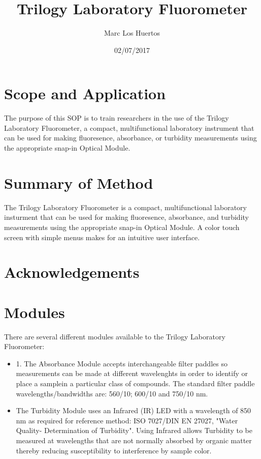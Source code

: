 \documentclass[12pt]{../SOP3_beta}\usepackage[]{graphicx}\usepackage[]{color}
\title{Trilogy Laboratory Fluorometer}
\date{02/07/2017}
\author{Marc Los Huertos}
\begin{document}
\maketitle

\section{Scope and Application}

\NP The purpose of this SOP is to train researchers in the use of the Trilogy Laboratory Fluorometer, a compact, multifunctional laboratory instrument that can be used for making fluoresence, absorbance, or turbidity measurements using the appropriate snap-in Optical Module. 

\section{Summary of Method}

\NP The Trilogy Laboratory Fluorometer is a compact, multifunctional laboratory insturment that can be used for making fluoresence, absorbance, and turbidity measurements using the appropriate snap-in Optical Module. A color touch screen with simple menus makes for an intuitive user interface. 

\tableofcontents

\newpage

\section{Acknowledgements}

\section{Modules}
\NP There are several different modules available to the Trilogy Laboratory Fluorometer:

\begin{itemize}
  \item 1. The Absorbance Module accepts interchangeable filter paddles so measurements can be made at different wavelenghts in order to identify or place a samplein a particular class of compounds. The standard filter paddle wavelengths/bandwidths are: 560/10; 600/10 and 750/10 nm.
  \item The Turbidity Module uses an Infrared (IR) LED with a wavelength of 850 nm as required for reference method: ISO 7027/DIN EN 27027, "Water Quality- Determination of Turbidity". Using Infrared allows Turbidity to be measured at wavelengths that are not normally absorbed by organic matter thereby reducing susceptibility to interference by sample color. 
\end{itemize}
\end{document}
